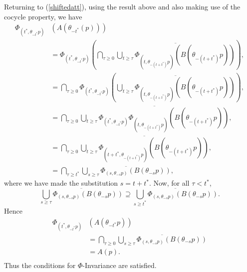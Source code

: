 \begin{prf}
  Returning to (\ref{shiftedatt}), using the result above and also making
  use of the cocycle property, we have
  \begin{align*}
  \Phi_{(t^*, \theta_{-t^*}p)} &(A(\theta_{-t^*}(p))) \\
  &=\Phi_{(t^*, \theta_{-t^*}p)}\left(\bigcap_{\tau \geq 0}
       \overline{ \bigcup_{t
       \geq \tau} \Phi_{(t, \theta_{-(t + t^*)}p)} (B(\theta_{-(t +
       t^*)}p))}\right), \\
  &= \bigcap_{\tau \geq 0} \Phi_{(t^*, \theta_{-t^*}p)}\left(
     \overline{\bigcup_{t \geq \tau} \Phi_{(t, \theta_{-(t + t^*)}p)}
     (B(\theta_{-(t + t^*)}p))}\right), \\
  &= \bigcap_{\tau \geq 0} \overline{\bigcup_{t \geq \tau} \Phi_{(t^*,
     \theta_{-t^*}p)} \Phi_{(t, \theta_{-(t + t^*)}p)} (B(\theta_{-(t +
     t^*)}p))}, \\
  &= \bigcap_{\tau \geq 0} \overline{\bigcup_{t \geq \tau} \Phi_{(t+t^*,
     \theta_{-(t+t^*)}p)} (B(\theta_{-(t + t^*)}p))}, \\
  &= \bigcap_{\tau \geq t^*} \overline{\bigcup_{s \geq \tau} \Phi_{(s,
     \theta_{-s}p)} (B(\theta_{-s}p))},
  \end{align*}
  where we have made the substitution $s = t + t^*$. Now, for all $\tau <
  t^*$,
  \[ \overline{\bigcup_{s \geq \tau} \Phi_{(s, \theta_{-s}p)}
     (B(\theta_{-s}p))} \supseteq \overline{\bigcup_{s \geq t^*} \Phi_{(s,
     \theta_{-s}p)} (B(\theta_{-s}p))}. \]
  Hence
  \begin{align*}
  \Phi_{(t^*, \theta_{-t^*}p)} &(A(\theta_{-t^*}p)) \\
  &= \bigcap_{\tau \geq 0} \overline{\bigcup_{s \geq \tau} \Phi_{(s,
     \theta_{-s}p)} (B(\theta_{-s}p))} \\
  &= A(p). \\
  \end{align*}
  Thus the conditions for $\Phi$-Invariance are satisfied.
\end{prf}

